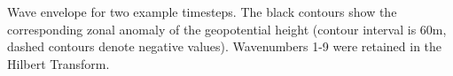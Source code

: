\label{fig:example_envelope}
Wave envelope for two example timesteps. The black contours show the corresponding zonal anomaly of the geopotential height (contour interval is 60m, dashed contours denote negative values). Wavenumbers 1-9 were retained in the Hilbert Transform.